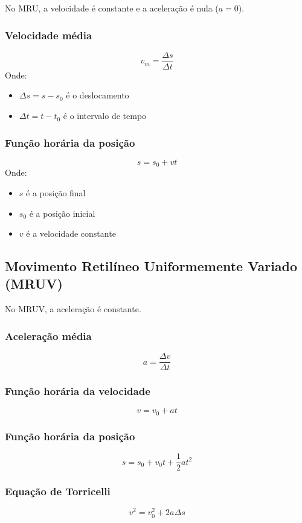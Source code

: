 \documentclass[a4paper,12pt]{article}
\begin{document}
No MRU, a velocidade é constante e a aceleração é nula ($a = 0$).

\subsubsection{Velocidade média}
\[
v_m = \frac{\Delta s}{\Delta t}
\]
Onde:
\begin{itemize}
    \item $\Delta s = s - s_0$ é o deslocamento
    \item $\Delta t = t - t_0$ é o intervalo de tempo
\end{itemize}

\subsubsection{Função horária da posição}
\[
s = s_0 + vt
\]
Onde:
\begin{itemize}
    \item $s$ é a posição final
    \item $s_0$ é a posição inicial
    \item $v$ é a velocidade constante
\end{itemize}

\subsection{Movimento Retilíneo Uniformemente Variado (MRUV)}

No MRUV, a aceleração é constante.

\subsubsection{Aceleração média}
\[
a = \frac{\Delta v}{\Delta t}
\]

\subsubsection{Função horária da velocidade}
\[
v = v_0 + at
\]

\subsubsection{Função horária da posição}
\[
s = s_0 + v_0 t + \frac{1}{2}at^2
\]

\subsubsection{Equação de Torricelli}
\[
v^2 = v_0^2 + 2a\Delta s
\]
\end{document}
